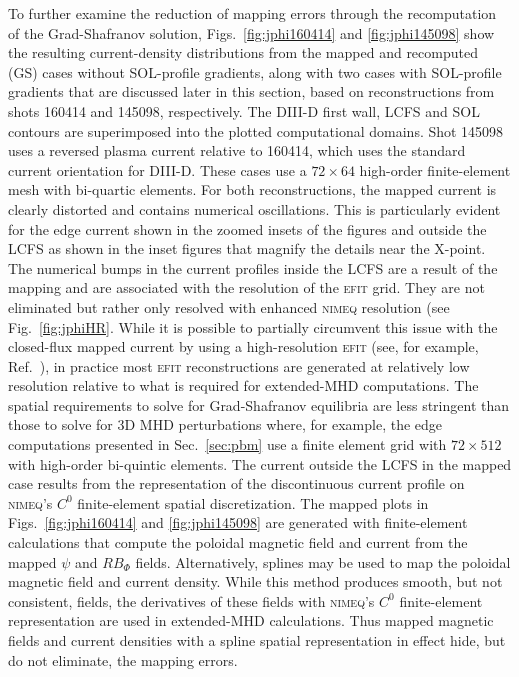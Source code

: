 \documentclass[english,aps,superscriptaddress,showkeys,showpacs,prepri,twocolumn]{revtex4}
\begin{document}
To further examine the reduction of mapping errors through the recomputation of
the Grad-Shafranov solution, Figs.~\ref{fig:jphi160414} and
\ref{fig:jphi145098} show the resulting current-density distributions from the
mapped and recomputed (GS) cases without SOL-profile gradients, 
along with two cases with SOL-profile
gradients that are discussed later in this section, based on reconstructions
from shots 160414 and 145098, respectively.  The DIII-D first wall, LCFS and
SOL contours are superimposed into the plotted computational domains. Shot
145098 uses a reversed plasma current relative to 160414, which uses the
standard current orientation for DIII-D. These cases use a $72\times64$
high-order finite-element mesh with bi-quartic elements. For both
reconstructions, the mapped current is clearly distorted and contains numerical
oscillations. This is particularly evident for the edge current shown in the
zoomed insets of the figures and outside the LCFS as shown in the inset figures
that magnify the details near the X-point.  The numerical bumps in the current
profiles inside the LCFS are a result of the mapping and are associated with
the resolution of the \textsc{efit} grid. They are not eliminated but rather
only resolved with enhanced \textsc{nimeq} resolution (see
Fig.~\ref{fig:jphiHR}. While it is possible to
partially circumvent this issue with the closed-flux mapped current by using a
high-resolution \textsc{efit} (see, for example, Ref.~\cite{Aiba07,King16m}),
in practice most \textsc{efit} reconstructions are generated at relatively low
resolution relative to what is required for extended-MHD
computations. The spatial requirements to solve for Grad-Shafranov equilibria
are less stringent than those to solve for 3D MHD perturbations where,
for example, the edge computations presented in Sec.~\ref{sec:pbm} use 
a finite element grid with $72\times512$ with high-order bi-quintic elements. 
The current
outside the LCFS in the mapped case results from the representation of the
discontinuous current profile on \textsc{nimeq}'s $C^0$ finite-element spatial
discretization.  The mapped plots in Figs.~\ref{fig:jphi160414} and
\ref{fig:jphi145098} are generated with finite-element calculations that
compute the poloidal magnetic field and current from the mapped $\psi$ and
$RB_\Phi$ fields.  Alternatively, splines may be used to map the poloidal
magnetic field and current density.  While this method produces smooth, but not
consistent, fields, the derivatives of these fields with \textsc{nimeq}'s $C^0$
finite-element representation are used in extended-MHD calculations. Thus
mapped magnetic fields and current densities with a spline spatial
representation in effect hide, but do not eliminate, the mapping errors.
\end{document}
